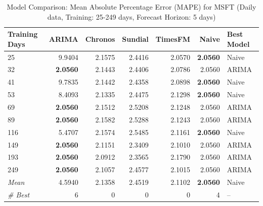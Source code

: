 \begin{table}[htbp]
\centering
\caption{Model Comparison: Mean Absolute Percentage Error (MAPE) for MSFT (Daily data, Training: 25-249 days, Forecast Horizon: 5 days)}
\label{tab:comparison_MSFT_1d_train-less-year-log_h5_MAPE}
\small
\begin{tabular}{lrrrrrl}
\toprule
Training Days & ARIMA & Chronos & Sundial & TimesFM & Naive & Best Model \\
\midrule
25 & 9.9404 & 2.1575 & 2.4416 & 2.0570 & \textbf{2.0560} & Naive \\
32 & \textbf{2.0560} & 2.1443 & 2.4406 & 2.0786 & 2.0560 & ARIMA \\
41 & 9.7835 & 2.1442 & 2.4358 & 2.0898 & \textbf{2.0560} & Naive \\
53 & 8.4093 & 2.1335 & 2.4475 & 2.1298 & \textbf{2.0560} & Naive \\
69 & \textbf{2.0560} & 2.1512 & 2.5208 & 2.1248 & 2.0560 & ARIMA \\
89 & \textbf{2.0560} & 2.1582 & 2.5288 & 2.1243 & 2.0560 & ARIMA \\
116 & 5.4707 & 2.1574 & 2.5485 & 2.1161 & \textbf{2.0560} & Naive \\
149 & \textbf{2.0560} & 2.1151 & 2.3409 & 2.1010 & 2.0560 & ARIMA \\
193 & \textbf{2.0560} & 2.0912 & 2.3565 & 2.1790 & 2.0560 & ARIMA \\
249 & \textbf{2.0560} & 2.1057 & 2.4577 & 2.1015 & 2.0560 & ARIMA \\
\midrule
\textit{Mean} & 4.5940 & 2.1358 & 2.4519 & 2.1102 & \textbf{2.0560} & Naive \\
\textit{\# Best} & 6 & 0 & 0 & 0 & 4 & -- \\
\bottomrule
\end{tabular}
\end{table}